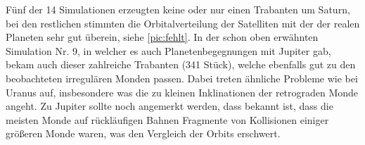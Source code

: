 \documentclass[12pt,a4paper,twoside]{article}
\begin{document}
Fünf der 14 Simulationen erzeugten keine oder nur einen Trabanten um Saturn, bei den restlichen stimmten die Orbitalverteilung der Satelliten mit der der realen Planeten sehr gut überein, siehe \ref{pic:fehlt}\cite{Nesvorny2007}. %
In der schon oben erwähnten Simulation Nr. 9, in welcher es auch Planetenbegegnungen mit Jupiter gab, bekam auch dieser zahlreiche Trabanten (341 Stück), welche ebenfalls gut zu den beobachteten irregulären Monden passen. Dabei treten ähnliche Probleme wie bei Uranus auf, insbesondere was die zu kleinen Inklinationen der retrograden Monde angeht.
Zu Jupiter sollte noch angemerkt werden, dass bekannt ist, dass die meisten Monde auf rückläufigen Bahnen Fragmente von Kollisionen einiger größeren Monde waren, was den Vergleich der Orbits erschwert\cite{Nesvorny2004,Nesvorny2007}.
\end{document}
